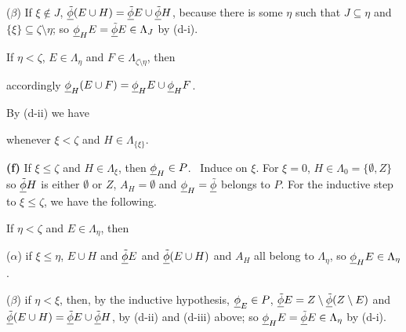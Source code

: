 {\qquad($\beta$) If $\xi\notin J$,
$\underline{\tilde\phi}(E\cup H)=\underline{\tilde\phi} E\cup\underline{\tilde\phi} H$, because there is some $\eta$
such that $J\subseteq\eta$ and $\{\xi\}\subseteq\zeta\setminus\eta$;
so ${\underline{\phi}}_HE=\underline{\tilde\phi} E\in\Lambda_J$ by (d-i).

\medskip

 If $\eta<\zeta$, $E\in\Lambda_{\eta}$ and
$F\in\Lambda_{\zeta\setminus\eta}$, then



\noindent accordingly ${\underline{\phi}}_H(E\cup F)={\underline{\phi}}_H E\cup{\underline{\phi}}_H F$.
\Qed


By (d-ii) we have


\noindent whenever $\xi<\zeta$ and $H\in\Lambda_{\{\xi\}}$.

\medskip

{\bf (f)} If $\xi\le\zeta$ and $H\in\Lambda_{\xi}$, then
${\underline{\phi}}_H\in P$.   \Prf\ Induce on $\xi$.   For $\xi=0$,
$H\in\Lambda_0=\{\emptyset,Z\}$ so $\underline{\tilde\phi} H$ is either $\emptyset$ or
$Z$, $A_H=\emptyset$ and ${\underline{\phi}}_H=\underline{\tilde\phi}$ belongs to $P$.
For the inductive step to
$\xi\le\zeta$, we have the following.

\medskip

 If $\eta<\zeta$ and $E\in\Lambda_{\eta}$, then

\qquad($\alpha$) if $\xi\le\eta$, $E\cup H$ and $\underline{\tilde\phi} E$ and
$\underline{\tilde\phi}(E\cup H)$ and $A_H$ all belong to $\Lambda_{\eta}$, so
${\underline{\phi}}_HE\in\Lambda_{\eta}$.

\qquad($\beta$) if $\eta<\xi$, then, by the inductive hypothesis,
${\underline{\phi}}_E\in P$, $\underline{\tilde\phi} E=Z\setminus\underline{\tilde\phi}(Z\setminus E)$ and
$\underline{\tilde\phi}(E\cup H)=\underline{\tilde\phi} E\cup\underline{\tilde\phi} H$, by (d-ii) and (d-iii) above;
so ${\underline{\phi}}_HE=\underline{\tilde\phi} E\in\Lambda_{\eta}$ by (d-i).

}
